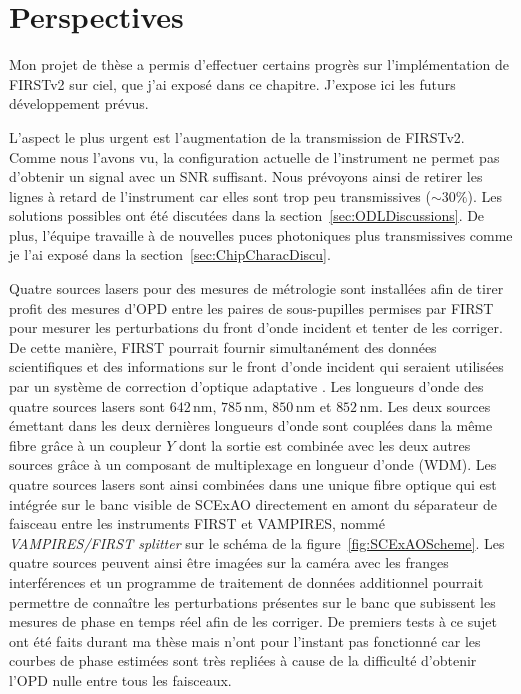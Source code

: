 \section{Perspectives}
\label{sec:V2SubaruProspectives}

Mon projet de thèse a permis d'effectuer certains progrès sur l'implémentation de \ac{FIRSTv2} sur ciel, que j'ai exposé dans ce chapitre. J'expose ici les futurs développement prévus.

L'aspect le plus urgent est l'augmentation de la transmission de \ac{FIRSTv2}. Comme nous l'avons vu, la configuration actuelle de l'instrument ne permet pas d'obtenir un signal avec un \ac{SNR} suffisant. Nous prévoyons ainsi de retirer les lignes à retard de l'instrument car elles sont trop peu transmissives ($\sim 30\%$). Les solutions possibles ont été discutées dans la section~\ref{sec:ODLDiscussions}. De plus, l'équipe travaille à de nouvelles puces photoniques plus transmissives comme je l'ai exposé dans la section~\ref{sec:ChipCharacDiscu}.

Quatre sources lasers pour des mesures de métrologie sont installées afin de tirer profit des mesures d'\ac{OPD} entre les paires de sous-pupilles permises par \ac{FIRST} pour mesurer les perturbations du front d'onde incident et tenter de les corriger. De cette manière, \ac{FIRST} pourrait fournir simultanément des données scientifiques et des informations sur le front d'onde incident qui seraient utilisées par un système de correction d'optique adaptative \citep{vievard2021}. Les longueurs d'onde des quatre sources lasers sont $642 \,$nm, $785 \,$nm, $850 \,$nm et $852 \,$nm. Les deux sources émettant dans les deux dernières longueurs d'onde sont couplées dans la même fibre grâce à un coupleur $Y$ dont la sortie est combinée avec les deux autres sources grâce à un composant de multiplexage en longueur d'onde (\ac{WDM}). Les quatre sources lasers sont ainsi combinées dans une unique fibre optique qui est intégrée sur le banc visible de \ac{SCExAO} directement en amont du séparateur de faisceau entre les instruments \ac{FIRST} et \ac{VAMPIRES}, nommé \textit{VAMPIRES/FIRST splitter} sur le schéma de la figure~\ref{fig:SCExAOScheme}. Les quatre sources peuvent ainsi être imagées sur la caméra avec les franges interférences et un programme de traitement de données additionnel pourrait permettre de connaître les perturbations présentes sur le banc que subissent les mesures de phase en temps réel afin de les corriger. De premiers tests à ce sujet ont été faits durant ma thèse mais n'ont pour l'instant pas fonctionné car les courbes de phase estimées sont très repliées à cause de la difficulté d'obtenir l'\ac{OPD} nulle entre tous les faisceaux.

